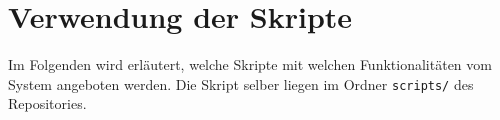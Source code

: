 
\section{Verwendung der Skripte}
Im Folgenden wird erläutert, welche Skripte mit welchen Funktionalitäten vom System angeboten werden. Die Skript selber liegen im Ordner \texttt{scripts/} des Repositories.

